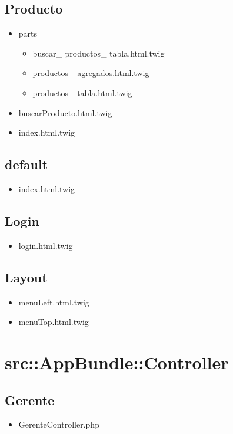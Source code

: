 		\subsection{Producto}	
			\begin{itemize}
			\item parts
			\begin{itemize}
				\item buscar\_ productos\_ tabla.html.twig
				\item productos\_ agregados.html.twig
				\item productos\_ tabla.html.twig
			\end{itemize}
			\item buscarProducto.html.twig
			\item index.html.twig
			\end{itemize}

		\subsection{default}
		\begin{itemize}
			\item index.html.twig
		\end{itemize}
		\subsection{Login}
		\begin{itemize}
			\item login.html.twig
		\end{itemize}
		\subsection{Layout}
		\begin{itemize}
			\item menuLeft.html.twig
			\item menuTop.html.twig
		\end{itemize}
		
		
		
		
	\section{src::AppBundle::Controller}
	\subsection{Gerente}
	\begin{itemize}
		\item GerenteController.php
	\end{itemize}
